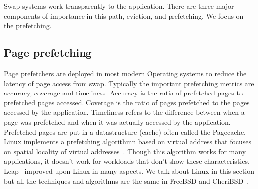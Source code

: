 
Swap systems work transparently to the application. There are three major components of importance in this path, eviction, and prefetching. We focus on the prefetching. 



\subsection{Page prefetching}
Page prefetchers are deployed in most modern Operating systems to reduce the latency of page access from swap. Typically the important prefetching metrics are accuracy, coverage and timeliness. Accuracy is the ratio of prefetched pages to prefetched pages accessed. Coverage is the ratio of pages prefetched to the pages accessed by the application. Timeliness refers to the difference between when a page was prefetched and when it was actually accessed by the application. Prefetched pages are put in a datastructure (cache) often called the Pagecache. Linux implements a prefetching algorithmn based on virtual address that focuses on spatial locality of virtual addresses~\cite{vma-readahead}. Though this algorithm works for many applications, it doesn't work for workloads that don't show these characteristics, Leap~\cite{leap} improved upon Linux in many aspects. We talk about Linux in this section but all the techniques and algorithms are the same in FreeBSD and CheriBSD~\cite{cheribsd}.

